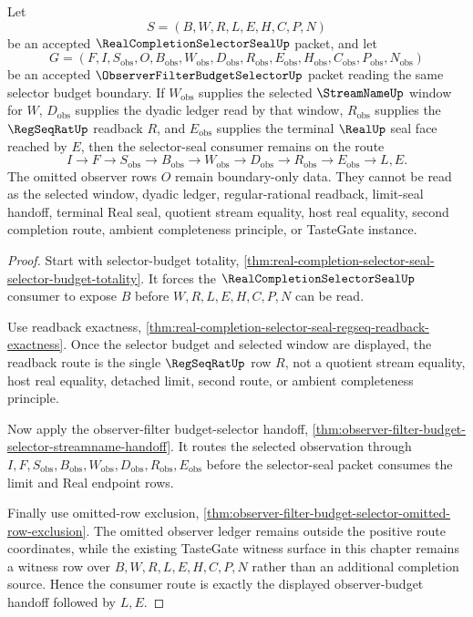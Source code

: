 \begin{theorem}
\label{thm:real-completion-selector-seal-observer-budget-handoff}
Let
$$
S=(B,W,R,L,E,H,C,P,N)
$$
be an accepted $\RealCompletionSelectorSealUp$ packet, and let
$$
G=(F,I,S_{\mathrm{obs}},O,B_{\mathrm{obs}},W_{\mathrm{obs}},D_{\mathrm{obs}},R_{\mathrm{obs}},E_{\mathrm{obs}},H_{\mathrm{obs}},C_{\mathrm{obs}},P_{\mathrm{obs}},N_{\mathrm{obs}})
$$
be an accepted $\ObserverFilterBudgetSelectorUp$ packet reading the same selector budget boundary. If $W_{\mathrm{obs}}$ supplies the selected $\StreamNameUp$ window for $W$, $D_{\mathrm{obs}}$ supplies the dyadic ledger read by that window, $R_{\mathrm{obs}}$ supplies the $\RegSeqRatUp$ readback $R$, and $E_{\mathrm{obs}}$ supplies the terminal $\RealUp$ seal face reached by $E$, then the selector-seal consumer remains on the route
$$
I \to F \to S_{\mathrm{obs}} \to B_{\mathrm{obs}} \to W_{\mathrm{obs}} \to D_{\mathrm{obs}} \to R_{\mathrm{obs}} \to E_{\mathrm{obs}} \to L,E.
$$
The omitted observer rows $O$ remain boundary-only data. They cannot be read as the selected window, dyadic ledger, regular-rational readback, limit-seal handoff, terminal Real seal, quotient stream equality, host real equality, second completion route, ambient completeness principle, or TasteGate instance.
\end{theorem}
\begin{proof}
Start with selector-budget totality, \autoref{thm:real-completion-selector-seal-selector-budget-totality}. It forces the $\RealCompletionSelectorSealUp$ consumer to expose $B$ before $W,R,L,E,H,C,P,N$ can be read.

Use readback exactness, \autoref{thm:real-completion-selector-seal-regseq-readback-exactness}. Once the selector budget and selected window are displayed, the readback route is the single $\RegSeqRatUp$ row $R$, not a quotient stream equality, host real equality, detached limit, second route, or ambient completeness principle.

Now apply the observer-filter budget-selector handoff, \autoref{thm:observer-filter-budget-selector-streamname-handoff}. It routes the selected observation through $I,F,S_{\mathrm{obs}},B_{\mathrm{obs}},W_{\mathrm{obs}},D_{\mathrm{obs}},R_{\mathrm{obs}},E_{\mathrm{obs}}$ before the selector-seal packet consumes the limit and Real endpoint rows.

Finally use omitted-row exclusion, \autoref{thm:observer-filter-budget-selector-omitted-row-exclusion}. The omitted observer ledger remains outside the positive route coordinates, while the existing TasteGate witness surface in this chapter remains a witness row over $B,W,R,L,E,H,C,P,N$ rather than an additional completion source. Hence the consumer route is exactly the displayed observer-budget handoff followed by $L,E$.
\end{proof}

